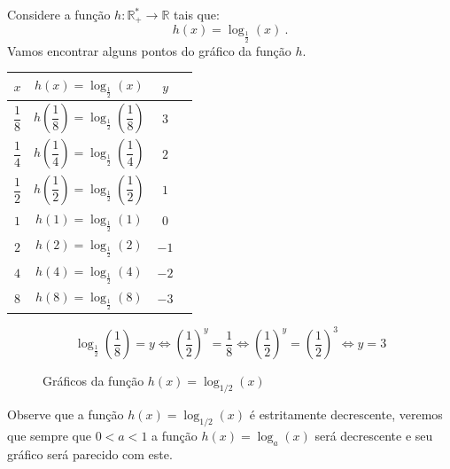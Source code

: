  \begin{exem} \label{ex:log-1/2}
    Considere a função $h: \mathbb{R_{+}^{*}} \rightarrow \mathbb{R} $ tais que:
 \[h(x) = \log_{\frac{1}{2}}(x) \ .\]
 Vamos encontrar alguns pontos do gráfico da função $h$.

  \begin{table}[H]
 \centering
 \begin{tabular}{|c|c|c|c|} \hline
 \rowcolor{cinza}
 $x$ & $h(x) = \log_{\frac{1}{2}}(x)$ & $y$ \\ \hline
 $\dfrac{1}{8}$ & $h\left(\dfrac{1}{8}\right)= \log_{\frac{1}{2}}\left(\dfrac{1}{8}\right)$ & $3$ \\ \hline
 $\dfrac{1}{4}$ & $h\left(\dfrac{1}{4}\right)= \log_{\frac{1}{2}}\left(\dfrac{1}{4}\right)$ & $2$ \\ \hline
 $\dfrac{1}{2}$ & $h\left(\dfrac{1}{2}\right)= \log_{\frac{1}{2}}\left(\dfrac{1}{2}\right)$ & $1$ \\ \hline
 $1$ & $h(1)= \log_{\frac{1}{2}}(1)$ & $0$ \\ \hline
 $2$ & $h(2)= \log_{\frac{1}{2}}(2)$ & $-1$ \\ \hline
 $4$ & $h(4)= \log_{\frac{1}{2}}(4)$ & $-2$ \\ \hline
 $8$ & $h(8)= \log_{\frac{1}{2}}(8)$ & $-3$ \\ \hline
 \end{tabular}
 \end{table}

 \[\log_{\frac{1}{2}}\left(\dfrac{1}{8}\right)= y \Leftrightarrow \left(\dfrac{1}{2}\right)^y= \dfrac{1}{8} \Leftrightarrow \left(\dfrac{1}{2}\right)^y= \left(\dfrac{1}{2}\right)^{3} \Leftrightarrow y=3\]


 \begin{figure}[H]
    \centering
    \caption{Gráficos da função $h(x)= \log_{1/2}(x)$}
   \end{figure}
 Observe que a função $h(x)= \log_{1/2}(x)$ é estritamente decrescente, veremos que sempre que $0< a< 1$ a função $h(x)= \log_{a}(x)$ será decrescente e seu gráfico será parecido com este.
 \end{exem}

